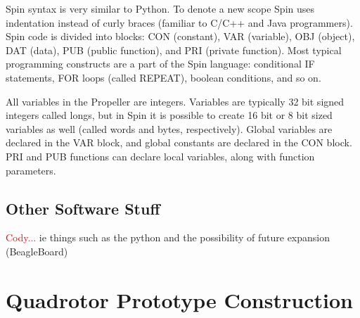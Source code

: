 \documentclass{article}
\numberwithin{equation}{section} %
\begin{document}
Spin syntax is very similar to Python. To denote a new scope Spin uses indentation instead of curly braces {} (familiar to C/C++ and Java programmers). Spin code is divided into blocks: CON (constant), VAR (variable), OBJ (object), DAT (data), PUB (public function), and PRI (private function). Most typical programming constructs are a part of the Spin language: conditional IF statements, FOR loops (called REPEAT), boolean conditions, and so on.

All variables in the Propeller are integers. Variables are typically 32 bit signed integers called longs, but in Spin it is possible to create 16 bit or 8 bit sized variables as well (called words and bytes, respectively). Global variables are declared in the VAR block, and global constants are declared in the CON block. PRI and PUB functions can declare local variables, along with function parameters. 


\subsection{Other Software Stuff}
\textcolor{red}{Cody...} ie things such as the python and the possibility of future expansion (BeagleBoard)



  

\section{Quadrotor Prototype Construction}

\end{document}
